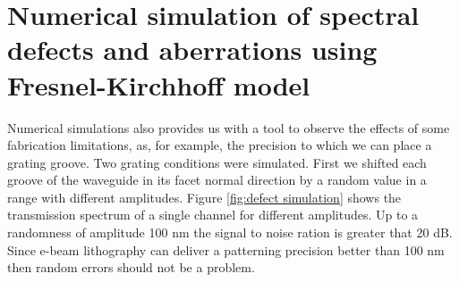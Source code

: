 \documentclass[12pt,twoside,english]{book}
\renewcommand{\~}{\perispomeni}%
\numberwithin{equation}{section}
\numberwithin{figure}{section}
\begin{document}
\section{Numerical simulation of spectral defects and aberrations using Fresnel-Kirchhoff model}
Numerical simulations also provides us with a tool to observe the effects of some fabrication limitations, as, for example, the precision to which we can place a grating groove. Two grating conditions were simulated. First we shifted each groove of the waveguide in its facet normal direction by a random value in a range with different amplitudes. Figure \ref{fig:defect simulation} shows the transmission spectrum of a single channel for different amplitudes. Up to a randomness of amplitude 100 nm the signal to noise ration is greater that 20 dB. Since e-beam lithography can deliver a patterning precision better than 100 nm then random errors should not be a problem.
\end{document}
